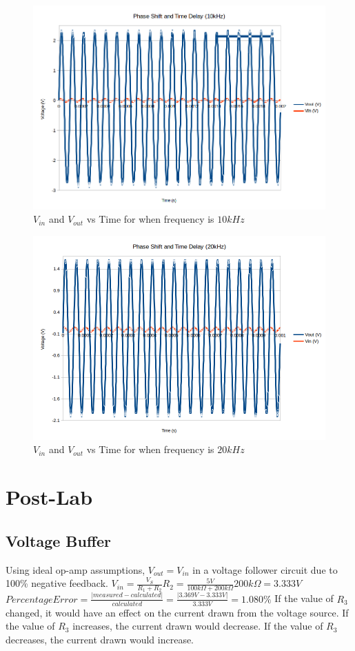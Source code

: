\documentclass[10pt]{article}
\begin{document}
\begin{figure}[H]
	\centering
	\includegraphics[width=\textwidth]{PhaseShift10.png}
	\caption{$V_{in}$ and $V_{out}$ vs Time for when frequency is $10kHz$}
\end{figure}
\begin{figure}[H]
	\centering
	\includegraphics[width=\textwidth]{PhaseShift20.png}
	\caption{$V_{in}$ and $V_{out}$ vs Time for when frequency is $20kHz$}
\end{figure}

\section*{Post-Lab}
\subsection*{Voltage Buffer}
\noindent Using ideal op-amp assumptions, $V_{out} = V_{in}$ in a voltage follower circuit due to 100\% negative feedback.
$V_{in} = \frac{V_S}{R_1 + R_2} R_2 = \frac{5V}{100k\Omega + 200k\Omega}200k\Omega = 3.333V$
$Percentage Error = \frac{|measured-calculated|}{calculated} = \frac{|3.369V-3.333V|}{3.333V} = 1.080\%$
\noindent If the value of $R_3$ changed, it would have an effect on the current drawn from the voltage source. If the value of $R_3$ increases, the current drawn would decrease. If the value of $R_3$ decreases, the current drawn would increase.
\end{document}
